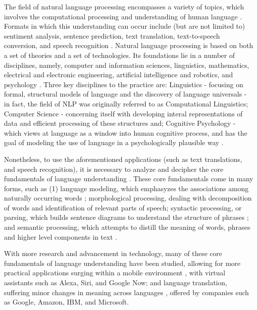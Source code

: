 The field of natural language processing encompasses a variety of topics, which involves the computational processing and understanding of human language \cite{otter2020survey}. Formats in which this understanding can occur include (but are not limited to) sentiment analysis, sentence prediction, text translation, text-to-speech conversion, and speech recognition \cite{chowdhury2003natural}. Natural language processing is based on both a set of theories and a set of technologies. Its foundations lie in a number of disciplines, namely, computer and information sciences, linguistics, mathematics, electrical and electronic engineering, artificial intelligence and robotics, and psychology \cite{chowdhury2003natural}. Three key disciplines to the practice are: Linguistics - focusing on formal, structural models of language and the discovery of language universals - in fact, the field of NLP was originally referred to as Computational Linguistics; Computer Science - concerning itself with developing interal representations of data and efficient processing of these structures and; Cognitive Psychology - which views at language as a window into human cognitive process, and has the goal of modeling the use of language in a psychologically plausible way  \cite{liddy2001natural}.

Nonetheless, to use the aforementioned applications (such as text translations, and speech recognition), it is necessary to analyze and decipher the core fundamentals of language understanding \cite{otter2020survey}. These core fundamentals come in many forms, such as (1) language modeling, which emphasyzes the associations among naturally occurring words \cite{DBLP:journals/corr/cs-CL-0108005}; morphological processing, dealing with decomposition of words and identification of relevant parts of speech; syntactic processing, or parsing, which builds sentence diagrams to understand the structure of phrases \cite{woolf2010building}; and semantic processing, which attempts to distill the meaning of words, phrases and higher level components in text \cite{otter2020survey}.

With more research and advancement in technology, many of these core fundamentals of language understanding have been studied, allowing for more practical applications surging within a mobile environment \cite{yu2016automatic}, with virtual assistants such as Alexa, Siri, and Google Now; and language translation, suffering minor changes in meaning across languages \cite{de2018no}, offered by companies such as Google, Amazon, IBM, and Microsoft.

